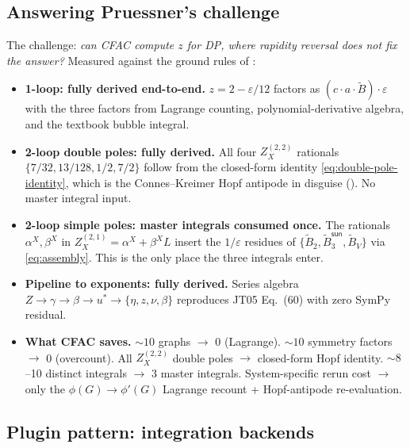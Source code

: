 \documentclass[11pt,a4paper]{article}
\theoremstyle{definition}
\theoremstyle{plain}
\begin{document}
\subsection{Answering Pruessner's challenge}

\begin{cfacbox}
The challenge: \emph{can CFAC compute $z$ for DP, where rapidity
reversal does not fix the answer?}  Measured against the
ground rules of :
\begin{itemize}[leftmargin=2em]
  \item \textbf{1-loop: fully derived end-to-end.}  $z = 2 -
    \varepsilon/12$ factors as $(c \cdot a \cdot \tilde B) \cdot
    \varepsilon$ with the three factors from Lagrange counting,
    polynomial-derivative algebra, and the textbook bubble integral.
  \item \textbf{2-loop double poles: fully derived.}  All four
    $Z_X^{(2,2)}$ rationals $\{7/32, 13/128, 1/2, 7/2\}$ follow from
    the closed-form identity \eqref{eq:double-pole-identity}, which
    is the Connes--Kreimer Hopf antipode in disguise
    ().  No master integral input.
  \item \textbf{2-loop simple poles: master integrals consumed
    once.}  The rationals $\alpha^X, \beta^X$ in $Z_X^{(2,1)} =
    \alpha^X + \beta^X L$ insert the $1/\varepsilon$ residues of
    $\{\tilde B_2, \tilde B_3^{\textsf{sun}}, \tilde B_V\}$ via
    \eqref{eq:assembly}.  This is the only place the three
    integrals enter.
  \item \textbf{Pipeline to exponents: fully derived.}  Series
    algebra $Z \to \gamma \to \beta \to u^* \to \{\eta, z, \nu, \beta\}$
    reproduces JT05 Eq.~(60) with zero SymPy residual.
  \item \textbf{What CFAC saves.}  $\sim 10$ graphs $\to$ 0
    (Lagrange).  $\sim 10$ symmetry factors $\to$ 0 (overcount).
    All $Z_X^{(2,2)}$ double poles $\to$ closed-form Hopf identity.
    $\sim 8$--10 distinct integrals $\to$ 3 master integrals.
    System-specific rerun cost $\to$ only the $\phi(G) \to \phi'(G)$
    Lagrange recount + Hopf-antipode re-evaluation.
\end{itemize}
\end{cfacbox}

\subsection{Plugin pattern: integration backends}
\end{document}
